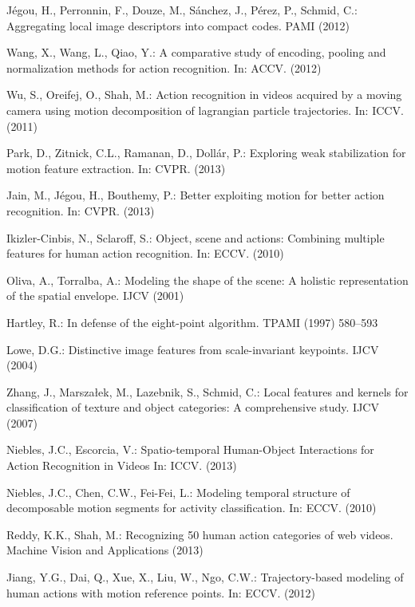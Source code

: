 \documentclass[runningheads]{llncs}
\begin{document}
\begin{thebibliography}{10}
J{\'e}gou, H., Perronnin, F., Douze, M., S{\'a}nchez, J., P{\'e}rez, P.,
  Schmid, C.:
\newblock Aggregating local image descriptors into compact codes.
\newblock PAMI (2012)

Wang, X., Wang, L., Qiao, Y.:
\newblock A comparative study of encoding, pooling and normalization methods
  for action recognition.
\newblock In: ACCV.
\newblock (2012)

Wu, S., Oreifej, O., Shah, M.:
\newblock Action recognition in videos acquired by a moving camera using motion
  decomposition of lagrangian particle trajectories.
\newblock In: ICCV. (2011)

Park, D., Zitnick, C.L., Ramanan, D., Doll{\'a}r, P.:
\newblock Exploring weak stabilization for motion feature extraction.
\newblock In: CVPR. (2013)

Jain, M., J{\'e}gou, H., Bouthemy, P.:
\newblock Better exploiting motion for better action recognition.
\newblock In: CVPR. (2013)

Ikizler-Cinbis, N., Sclaroff, S.:
\newblock Object, scene and actions: Combining multiple features for human
  action recognition.
\newblock In: ECCV.
\newblock (2010)

Oliva, A., Torralba, A.:
\newblock Modeling the shape of the scene: A holistic representation of the
  spatial envelope.
\newblock IJCV (2001)

Hartley, R.:
\newblock In defense of the eight-point algorithm.
\newblock TPAMI (1997)  580--593

Lowe, D.G.:
\newblock Distinctive image features from scale-invariant keypoints.
\newblock IJCV (2004)

Zhang, J., Marsza{\l}ek, M., Lazebnik, S., Schmid, C.:
\newblock Local features and kernels for classification of texture and object
  categories: A comprehensive study.
\newblock IJCV (2007)

Niebles, J.C., Escorcia, V.:
\newblock Spatio-temporal Human-Object Interactions for Action Recognition in Videos
\newblock In: ICCV.
\newblock (2013)

Niebles, J.C., Chen, C.W., Fei-Fei, L.:
\newblock Modeling temporal structure of decomposable motion segments for
  activity classification.
\newblock In: ECCV.
\newblock (2010)

Reddy, K.K., Shah, M.:
\newblock Recognizing 50 human action categories of web videos.
\newblock Machine Vision and Applications (2013)

Jiang, Y.G., Dai, Q., Xue, X., Liu, W., Ngo, C.W.:
\newblock Trajectory-based modeling of human actions with motion reference
  points.
\newblock In: ECCV.
\newblock (2012)

\end{thebibliography}


\end{document}
